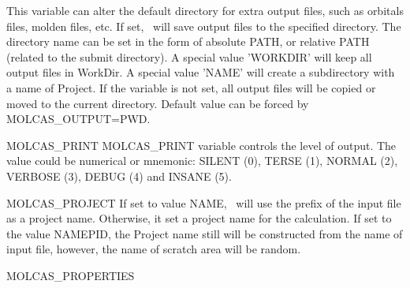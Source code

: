 \begin{variablelist}
This variable can alter the default directory for extra output files,
such as orbitals files, molden files, etc.
If set, \molcas\ will save output files to the specified directory.
The directory name can be set in the form of absolute PATH, or
relative PATH (related to the submit directory).
A special value 'WORKDIR' will keep all output files in WorkDir.
A special value 'NAME' will create a subdirectory with a name of Project.
If the variable is not set, all output files will be copied or moved
to the current directory. Default value can be forced by MOLCAS\_OUTPUT=PWD.
\item[MOLCAS\_PRINT]
MOLCAS\_PRINT variable controls the level of output. The value could be numerical or mnemonic:
SILENT (0), TERSE (1), NORMAL (2), VERBOSE (3), DEBUG (4) and INSANE (5).
\item[MOLCAS\_PROJECT]
If set to value NAME, \molcas\ will use the prefix of the input file
as a project name. Otherwise, it set a project name for the calculation.
If set to the value NAMEPID, the Project name still will be constructed
from the name of input file, however, the name of scratch area will
be random.
\item[MOLCAS\_PROPERTIES]

\end{variablelist}

